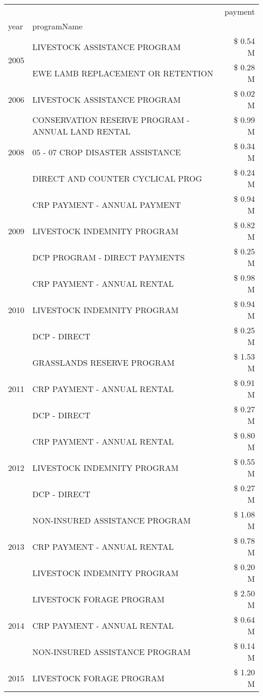 \begin{tabular}{llr}
\toprule
 &  & payment \\
year & programName &  \\
\midrule
\multirow[t]{2}{*}{2005} & LIVESTOCK ASSISTANCE PROGRAM & \$ 0.54 M \\
 & EWE LAMB REPLACEMENT OR RETENTION & \$ 0.28 M \\
\cline{1-3}
2006 & LIVESTOCK ASSISTANCE PROGRAM & \$ 0.02 M \\
\cline{1-3}
\multirow[t]{3}{*}{2008} & CONSERVATION RESERVE PROGRAM - ANNUAL LAND RENTAL & \$ 0.99 M \\
 & 05 - 07 CROP DISASTER ASSISTANCE & \$ 0.34 M \\
 & DIRECT AND COUNTER CYCLICAL PROG & \$ 0.24 M \\
\cline{1-3}
\multirow[t]{3}{*}{2009} & CRP PAYMENT - ANNUAL PAYMENT & \$ 0.94 M \\
 & LIVESTOCK INDEMNITY PROGRAM & \$ 0.82 M \\
 & DCP PROGRAM - DIRECT PAYMENTS & \$ 0.25 M \\
\cline{1-3}
\multirow[t]{3}{*}{2010} & CRP PAYMENT - ANNUAL RENTAL & \$ 0.98 M \\
 & LIVESTOCK INDEMNITY PROGRAM & \$ 0.94 M \\
 & DCP - DIRECT & \$ 0.25 M \\
\cline{1-3}
\multirow[t]{3}{*}{2011} & GRASSLANDS RESERVE PROGRAM & \$ 1.53 M \\
 & CRP PAYMENT - ANNUAL RENTAL & \$ 0.91 M \\
 & DCP - DIRECT & \$ 0.27 M \\
\cline{1-3}
\multirow[t]{3}{*}{2012} & CRP PAYMENT - ANNUAL RENTAL & \$ 0.80 M \\
 & LIVESTOCK INDEMNITY PROGRAM & \$ 0.55 M \\
 & DCP - DIRECT & \$ 0.27 M \\
\cline{1-3}
\multirow[t]{3}{*}{2013} & NON-INSURED ASSISTANCE PROGRAM & \$ 1.08 M \\
 & CRP PAYMENT - ANNUAL RENTAL & \$ 0.78 M \\
 & LIVESTOCK INDEMNITY PROGRAM & \$ 0.20 M \\
\cline{1-3}
\multirow[t]{3}{*}{2014} & LIVESTOCK FORAGE PROGRAM & \$ 2.50 M \\
 & CRP PAYMENT - ANNUAL RENTAL & \$ 0.64 M \\
 & NON-INSURED ASSISTANCE PROGRAM & \$ 0.14 M \\
\cline{1-3}
\multirow[t]{3}{*}{2015} & LIVESTOCK FORAGE PROGRAM & \$ 1.20 M \\

\end{tabular}
